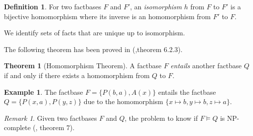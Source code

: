\documentclass{article}
\theoremstyle{definition}
\newtheorem{definition}{Definition}[section]
\newtheorem{theorem}{Theorem}[section]
\newtheorem{example}{Example}[section]
\theoremstyle{remark}
\newtheorem{remark}{Remark}[section]
\begin{document}
\begin{definition}
For two factbases $F$ and $F'$, an \emph{isomorphism} $h$ from $F$ to $F'$ is a bijective homomorphism where its inverse is an homomorphism from $F'$ to $F$. 
\end{definition}

We identify sets of facts that are unique up to isomorphism.


The following theorem has been proved in (\cite{base},theorem 6.2.3).

\begin{theorem}[Homomorphism Theorem] \label{hom_thm}
A factbase $F$ \emph{entails} another factbase $Q$ if and only if there exists a homomorphism from $Q$ to $F$.
\end{theorem}

\begin{example}
The factbase $F = \{P(b,a),A(x)\}$ entails the factbase $Q = \{P(x,a),P(y,z)\}$ due to the homomorphism $\{x \mapsto b, y \mapsto b, z \mapsto a \}$.
\end{example}

\begin{remark}
Given two factbases $F$ and $Q$, the problem to know if $F \models Q$ is NP-complete (\cite{NP}, theorem 7). 
\end{remark}
\end{document}
